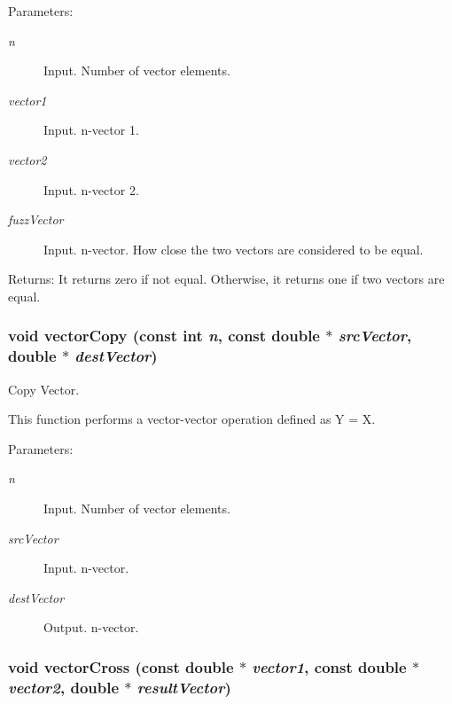 \begin{Desc}
\item[Parameters:]
\begin{description}
\item[{\em n}]Input. Number of vector elements. \item[{\em vector1}]Input. n-vector 1. \item[{\em vector2}]Input. n-vector 2. \item[{\em fuzzVector}]Input. n-vector. How close the two vectors are considered to be equal.\end{description}
\end{Desc}
\begin{Desc}
\item[Returns:]It returns zero if not equal. Otherwise, it returns one if two vectors are equal. \end{Desc}
\hypertarget{group__a_g08d2c57a110ec57f89669160ae1fd089}{
\subsubsection[vectorCopy]{\setlength{\rightskip}{0pt plus 5cm}void vectorCopy (const int {\em n}, \/  const double $\ast$ {\em srcVector}, \/  double $\ast$ {\em destVector})}}
\label{group__a_g08d2c57a110ec57f89669160ae1fd089}


Copy Vector. 

This function performs a vector-vector operation defined as Y = X.

\begin{Desc}
\item[Parameters:]
\begin{description}
\item[{\em n}]Input. Number of vector elements. \item[{\em srcVector}]Input. n-vector. \item[{\em destVector}]Output. n-vector. \end{description}
\end{Desc}
\hypertarget{group__a_g1ac846f1472a6bbb80a7b10e44c9c8e7}{
\subsubsection[vectorCross]{\setlength{\rightskip}{0pt plus 5cm}void vectorCross (const double $\ast$ {\em vector1}, \/  const double $\ast$ {\em vector2}, \/  double $\ast$ {\em resultVector})}}
\label{group__a_g1ac846f1472a6bbb80a7b10e44c9c8e7}


